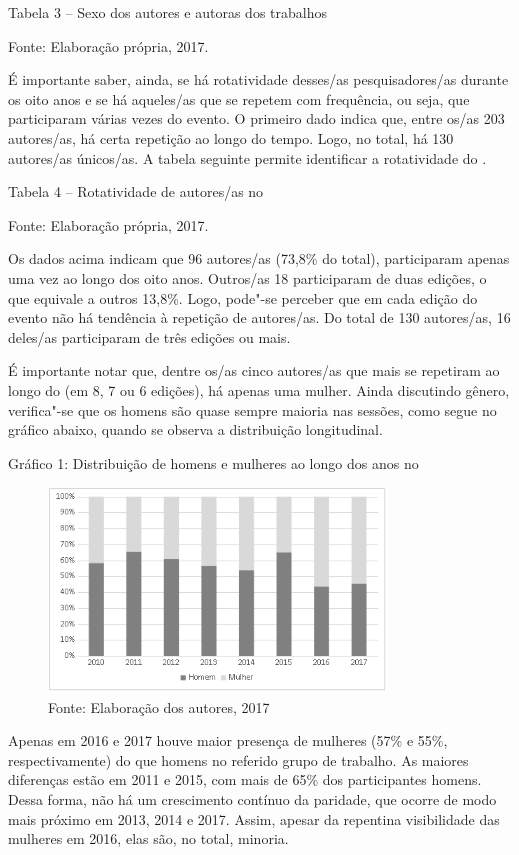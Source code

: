 Tabela 3 -- Sexo dos autores e autoras dos trabalhos


Fonte: Elaboração própria, 2017.

É importante saber, ainda, se há rotatividade desses/as pesquisadores/as
durante os oito anos e se há aqueles/as que se repetem com frequência,
ou seja, que participaram várias vezes do evento. O primeiro dado indica
que, entre os/as 203 autores/as, há certa repetição ao longo do tempo.
Logo, no total, há 130 autores/as únicos/as. A tabela seguinte permite
identificar a rotatividade do .

Tabela 4 -- Rotatividade de autores/as no 

Fonte: Elaboração própria, 2017.

Os dados acima indicam que 96 autores/as (73,8\% do total), participaram
apenas uma vez ao longo dos oito anos. Outros/as 18 participaram de duas
edições, o que equivale a outros 13,8\%. Logo, pode"-se perceber que em
cada edição do evento não há tendência à repetição de autores/as. Do
total de 130 autores/as, 16 deles/as participaram de três edições ou
mais.

É importante notar que, dentre os/as cinco autores/as que mais se
repetiram ao longo do  (em 8, 7 ou 6 edições), há apenas uma mulher.
Ainda discutindo gênero, verifica"-se que os homens são quase sempre
maioria nas sessões, como segue no gráfico abaixo, quando se observa a
distribuição longitudinal.

Gráfico 1: Distribuição de homens e mulheres ao longo dos anos no 

\begin{figure}[!ht]
\centering
 \includegraphics[width=90mm]{./imgs/graf3_1.png}
\caption{Fonte: Elaboração dos autores, 2017}
\end{figure}

Apenas em 2016 e 2017 houve maior presença de mulheres (57\% e 55\%,
respectivamente) do que homens no referido grupo de trabalho. As maiores
diferenças estão em 2011 e 2015, com mais de 65\% dos participantes
homens. Dessa forma, não há um crescimento contínuo da paridade, que
ocorre de modo mais próximo em 2013, 2014 e 2017. Assim, apesar da
repentina visibilidade das mulheres em 2016, elas são, no total,
minoria.

